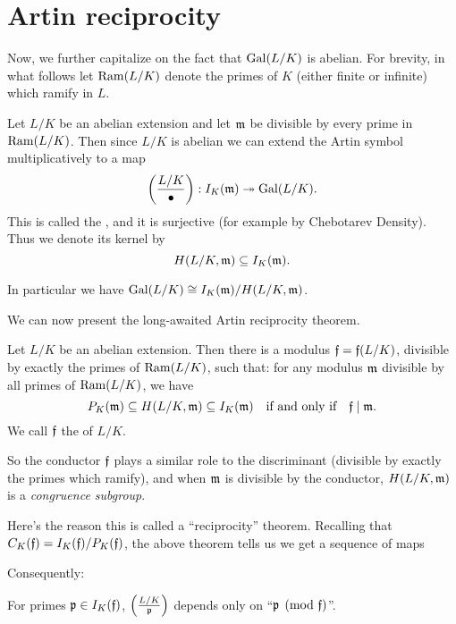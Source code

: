 \section{Artin reciprocity}
Now, we further capitalize on the fact that $\operatorname{Gal}(L/K)$ is abelian.
For brevity, in what follows let $\operatorname{Ram}(L/K)$ denote the primes of $K$
(either finite or infinite) which ramify in $L$.

\begin{definition}
	Let $L/K$ be an abelian extension and let $\mathfrak m$ be
	divisible by every prime in $\operatorname{Ram}(L/K)$.
	Then since $L/K$ is abelian we can extend the Artin symbol
	multiplicatively to a map
	\[
		\left( \frac{L/K}{\bullet} \right) :
		I_K(\mathfrak m) \twoheadrightarrow \operatorname{Gal}(L/K).
	\]
	This is called the ,
	and it is surjective (for example by Chebotarev Density).
	Thus we denote its kernel by 
	\[ H(L/K, \mathfrak m) \subseteq I_K(\mathfrak m). \]
\end{definition}
In particular we have
$\operatorname{Gal}(L/K) \cong I_K(\mathfrak m) / H(L/K, \mathfrak m)$.

We can now present the long-awaited Artin reciprocity theorem.
\begin{theorem}
	Let $L/K$ be an abelian extension.
	Then there is a modulus $\mathfrak f = \mathfrak f(L/K)$,
	divisible by exactly the primes of $\operatorname{Ram}(L/K)$, such that:
	for any modulus $\mathfrak m$ divisible by all primes of $\operatorname{Ram}(L/K)$, we have
	\[ 
		P_K(\mathfrak m) \subseteq H(L/K, \mathfrak m) \subseteq I_K(\mathfrak m)
		\quad\text{if and only if}\quad
		\mathfrak f \mid \mathfrak m.
	\]
	We call $\mathfrak f$ the  of $L/K$.
\end{theorem}
So the conductor $\mathfrak f$ plays a similar role to the discriminant
(divisible by exactly the primes which ramify),
and when $\mathfrak m$ is divisible by the conductor,
$H(L/K, \mathfrak m)$ is a \emph{congruence subgroup}.

Here's the reason this is called a ``reciprocity'' theorem.
Recalling that $C_K(\mathfrak f) = I_K(\mathfrak f) / P_K(\mathfrak f)$,
the above theorem tells us we get a sequence of maps
\begin{center}
\end{center}
Consequently:
\begin{moral}
	For primes $\mathfrak p \in I_K(\mathfrak f)$,
	$\left( \frac{L/K}{\mathfrak p} \right)$ depends
	only on ``$\mathfrak p \pmod {\mathfrak f}$''.
\end{moral}

